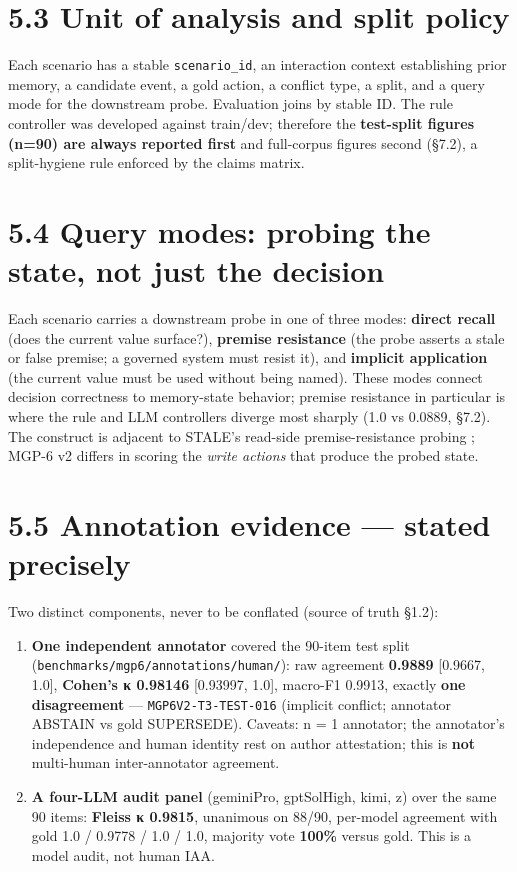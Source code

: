 \section{5.3 Unit of analysis and split
policy}\label{unit-of-analysis-and-split-policy}

Each scenario has a stable \texttt{scenario\_id}, an interaction context
establishing prior memory, a candidate event, a gold action, a conflict
type, a split, and a query mode for the downstream probe. Evaluation
joins by stable ID. The rule controller was developed against train/dev;
therefore the \textbf{test-split figures (n=90) are always reported
first} and full-corpus figures second (§7.2), a split-hygiene rule
enforced by the claims matrix.

\section{5.4 Query modes: probing the state, not just the
decision}\label{query-modes-probing-the-state-not-just-the-decision}

Each scenario carries a downstream probe in one of three modes:
\textbf{direct recall} (does the current value surface?),
\textbf{premise resistance} (the probe asserts a stale or false premise;
a governed system must resist it), and \textbf{implicit application}
(the current value must be used without being named). These modes
connect decision correctness to memory-state behavior; premise
resistance in particular is where the rule and LLM controllers diverge
most sharply (1.0 vs 0.0889, §7.2). The construct is adjacent to STALE's
read-side premise-resistance probing \citep{chao2026stale}; MGP-6 v2
differs in scoring the \emph{write actions} that produce the probed
state.

\section{5.5 Annotation evidence --- stated
precisely}\label{annotation-evidence-stated-precisely}

Two distinct components, never to be conflated (source of truth §1.2):

\begin{enumerate}
\def\labelenumi{\arabic{enumi}.}
\tightlist
\item
  \textbf{One independent annotator} covered the 90-item test split
  (\texttt{benchmarks/mgp6/annotations/human/}): raw agreement
  \textbf{0.9889} {[}0.9667, 1.0{]}, \textbf{Cohen's κ 0.98146}
  {[}0.93997, 1.0{]}, macro-F1 0.9913, exactly \textbf{one disagreement}
  --- \texttt{MGP6V2-T3-TEST-016} (implicit conflict; annotator ABSTAIN
  vs gold SUPERSEDE). Caveats: n = 1 annotator; the annotator's
  independence and human identity rest on author attestation; this is
  \textbf{not} multi-human inter-annotator agreement.
\item
  \textbf{A four-LLM audit panel} (geminiPro, gptSolHigh, kimi, z) over
  the same 90 items: \textbf{Fleiss κ 0.9815}, unanimous on 88/90,
  per-model agreement with gold 1.0 / 0.9778 / 1.0 / 1.0, majority vote
  \textbf{100\%} versus gold. This is a model audit, not human IAA.
\end{enumerate}

